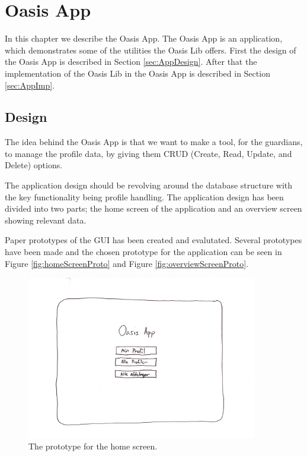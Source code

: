 \chapter{Oasis App}
\label{ch:App}
In this chapter we describe the Oasis App. The Oasis App is an application, which demonstrates some of the utilities the Oasis Lib offers. First the design of the Oasis App is described in Section \vref{sec:AppDesign}. After that the implementation of the Oasis Lib in the Oasis App is described in Section \vref{sec:AppImp}.

\section{Design}
\label{sec:AppDesign}
The idea behind the Oasis App is that we want to make a tool, for the guardians, to manage the profile data, by giving them CRUD (Create, Read, Update, and Delete) options.

The application design should be revolving around the database structure with the key functionality being profile handling.
The application design has been divided into two parts; the home screen of the application and an overview screen showing relevant data.

Paper prototypes of the GUI has been created and evalutated.
Several prototypes have been made and the chosen prototype for the application can be seen in Figure \vref{fig:homeScreenProto} and Figure \vref{fig:overviewScreenProto}.

\begin{figure}[H]
	\centering
		\includegraphics[width=0.9\textwidth]{Images/homeScreenPrototype}
	\caption{The prototype for the home screen.}
	\label{fig:homeScreenProto}
\end{figure}

